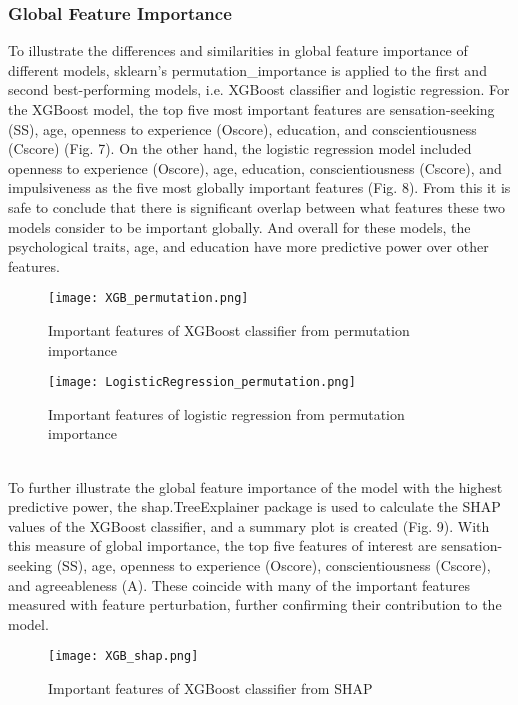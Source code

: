 \documentclass[12pt]{article}
\begin{document}
\subsubsection{Global Feature Importance}
To illustrate the differences and similarities in global feature importance of different models, sklearn’s permutation\_importance is applied to the first and second best-performing models, i.e. XGBoost classifier and logistic regression. For the XGBoost model, the top five most important features are sensation-seeking (SS), age, openness to experience (Oscore), education, and conscientiousness (Cscore) (Fig. 7). On the other hand, the logistic regression model included openness to experience (Oscore), age, education, conscientiousness (Cscore), and impulsiveness as the five most globally important features (Fig. 8). From this it is safe to conclude that there is significant overlap between what features these two models consider to be important globally. And overall for these models, the psychological traits, age, and education have more predictive power over other features. 
\begin{figure}[!h]
\centering
\texttt{[image: XGB\_permutation.png]}
\caption{Important features of XGBoost classifier from permutation importance}
\end{figure}
\begin{figure}[!h]
\centering
\texttt{[image: LogisticRegression\_permutation.png]}
\caption{Important features of logistic regression from permutation importance}
\end{figure}
\\
To further illustrate the global feature importance of the model with the highest predictive power, the shap.TreeExplainer package is used to calculate the SHAP values of the XGBoost classifier, and a summary plot is created (Fig. 9).  With this measure of global importance, the top five features of interest are sensation-seeking (SS), age, openness to experience (Oscore), conscientiousness (Cscore), and agreeableness (A). These coincide with many of the important features measured with feature perturbation, further confirming their contribution to the model. 

\begin{figure}[!h]
\centering
\texttt{[image: XGB\_shap.png]}
\caption{Important features of XGBoost classifier from SHAP}
\end{figure}
\end{document}
